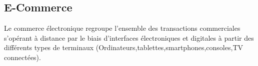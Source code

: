 \subsection{E-Commerce}



Le commerce électronique regroupe l’ensemble des transactions commerciales s’opérant à distance par le biais d’interfaces électroniques et digitales à partir des différents types de terminaux (Ordinateurs,tablettes,smartphones,consoles,TV connectées).
